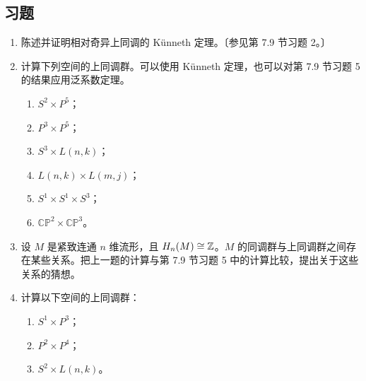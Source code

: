 \subsection*{习题}
\begin{enumerate}
\item 陈述并证明相对奇异上同调的 Künneth 定理。〔参见第 7.9 节习题 2。〕
\item 计算下列空间的上同调群。可以使用 Künneth 定理，也可以对第 7.9 节习题 5 的结果应用泛系数定理。
\begin{enumerate}[label=(\alph*)]
\item $S^2\times P^5$；\item $P^3\times P^5$；\item $S^3\times L(n,k)$；
\item $L(n,k)\times L(m,j)$；\item $S^1\times S^1\times S^3$；\item $\mathbb{CP}^2\times\mathbb{CP}^3$。
\end{enumerate}
\item 设 $M$ 是紧致连通 $n$ 维流形，且 $H_n(M)\cong\mathbb{Z}$。$M$ 的同调群与上同调群之间存在某些关系。把上一题的计算与第 7.9 节习题 5 中的计算比较，提出关于这些关系的猜想。
\item 计算以下空间的上同调群：
\begin{enumerate}[label=(\alph*)]
\item $S^1\times P^3$；\item $P^2\times P^4$；\item $S^2\times L(n,k)$。
\end{enumerate}
\end{enumerate}
